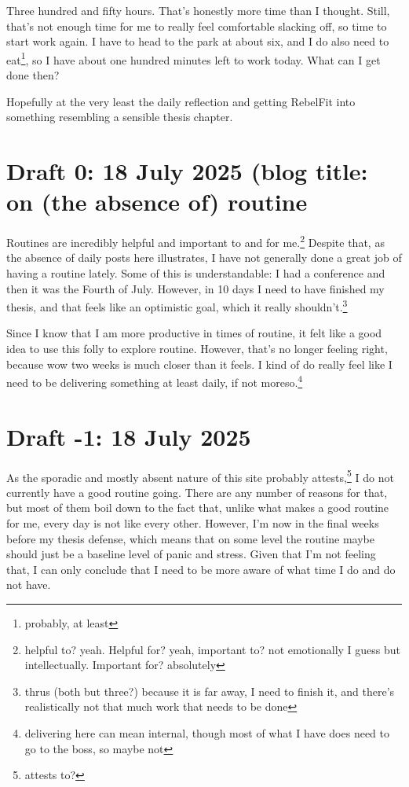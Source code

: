 \documentclass[12pt]{article}
\renewcommand{\,}{\textsuperscript{,}}
\begin{document}
Three hundred and fifty hours.  
That's honestly more time than I thought.  
Still, that's not enough time for me to really feel comfortable slacking off, so time to start work again.  
I have to head to the park at about six, and I do also need to eat\footnote{probably, at least}, so I have about one hundred minutes left to work today.  
What can I get done then?

Hopefully at the very least the daily reflection and getting RebelFit into something resembling a sensible thesis chapter.

\section{Draft 0: 18 July 2025 (blog title: on (the absence of) routine}

Routines are incredibly helpful and important to and for me.\footnote{helpful to? yeah. Helpful for? yeah, important to? not emotionally I guess but intellectually. Important for? absolutely}  
Despite that, as the absence of daily posts here illustrates, I have not generally done a great job of having a routine lately.  
Some of this is understandable: I had a conference and then it was the Fourth of July.  
However, in 10 days I need to have finished my thesis, and that feels like an optimistic goal, which it really shouldn't.\footnote{thrus (both but three?) because it is far away, I need to finish it, and there's realistically not that much work that needs to be done}

Since I know that I am more productive in times of routine, it felt like a good idea to use this folly to explore routine.  
However, that's no longer feeling right, because wow two weeks is much closer than it feels.  
I kind of do really feel like I need to be delivering something at least daily, if not moreso.\footnote{delivering here can mean internal, though most of what I have does need to go to the boss, so maybe not}

\section{Draft -1: 18 July 2025}

As the sporadic and mostly absent nature of this site probably attests,\footnote{attests to?} I do not currently have a good routine going.  
There are any number of reasons for that, but most of them boil down to the fact that, unlike what makes a good routine for me, every day is not like every other.  
However, I'm now in the final weeks before my thesis defense, which means that on some level the routine maybe should just be a baseline level of panic and stress.  
Given that I'm not feeling that, I can only conclude that I need to be more aware of what time I do and do not have.
\end{document}
